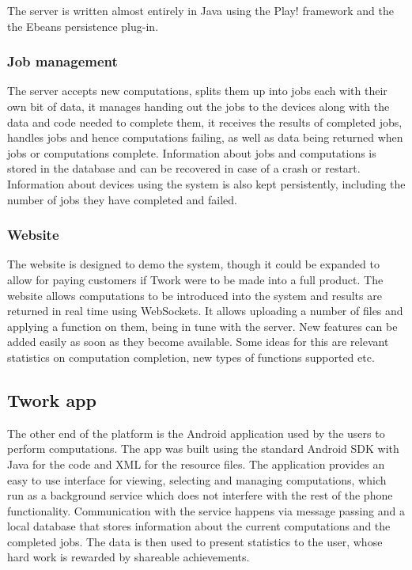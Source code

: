 \documentclass[a4paper,10pt]{article}
\begin{document}
The server is written almost entirely in Java using the Play! framework and the the Ebeans persistence plug-in.

\subsubsection{Job management}
The server accepts new computations, splits them up into jobs each with their own bit of data, it manages handing out the jobs to the devices along with
the data and code needed to complete them, it receives the results of completed jobs, handles jobs and hence computations failing, as well
as data being returned when jobs or computations complete.
Information about jobs and computations is stored in the database and can be recovered
in case of a crash or restart.
Information about devices using the system is also kept persistently, including the number of jobs they have completed and failed.

\subsubsection{Website}


The website is designed to demo the system, though it could be expanded to allow for paying customers if Twork were to be made into a full product.
The website allows computations to be introduced into the system and results are returned in real time using WebSockets. It allows uploading a number of files and applying a function on them, being in tune with the server. New features can be added easily as soon as they become available. Some ideas for this are relevant statistics on computation completion, new types of functions supported etc.


\subsection{Twork app}
The other end of the platform is the Android application used by the users to perform computations. The app was built using the standard Android SDK with Java for the code and XML for the resource files. The application provides an easy to use interface for viewing, selecting and managing computations, which run as a background service which does not interfere with the rest of the phone functionality. Communication with the service happens via message passing and a local database that stores information about the current computations and the completed jobs. The data is then used to present statistics to the user, whose hard work is rewarded by shareable achievements. 
\end{document}
